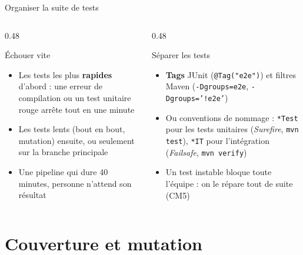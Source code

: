 \documentclass[aspectratio=169,10pt]{beamer}
\begin{document}
\begin{frame}{Organiser la suite de tests}
  \begin{columns}[T]
    \begin{column}{0.48\textwidth}
      \begin{block}{Échouer vite}
        \begin{itemize}
          \item Les tests les plus \textbf{rapides} d'abord : une erreur de compilation ou un test unitaire rouge arrête tout en une minute
          \item Les tests lents (bout en bout, mutation) ensuite, ou seulement sur la branche principale
          \item Une pipeline qui dure 40 minutes, personne n'attend son résultat
        \end{itemize}
      \end{block}
    \end{column}
    \begin{column}{0.48\textwidth}
      \begin{block}{Séparer les tests}
        \begin{itemize}
          \item \textbf{Tags} JUnit (\texttt{@Tag("e2e")}) et filtres Maven (\texttt{-Dgroups=e2e}, \texttt{-Dgroups='!e2e'})
          \item Ou conventions de nommage : \texttt{*Test} pour les tests unitaires (\textit{Surefire}, \texttt{mvn test}), \texttt{*IT} pour l'intégration (\textit{Failsafe}, \texttt{mvn verify})
          \item Un test instable bloque toute l'équipe : on le répare tout de suite (CM5)
        \end{itemize}
      \end{block}
    \end{column}
  \end{columns}
\end{frame}

\section{Couverture et mutation}
\end{document}
